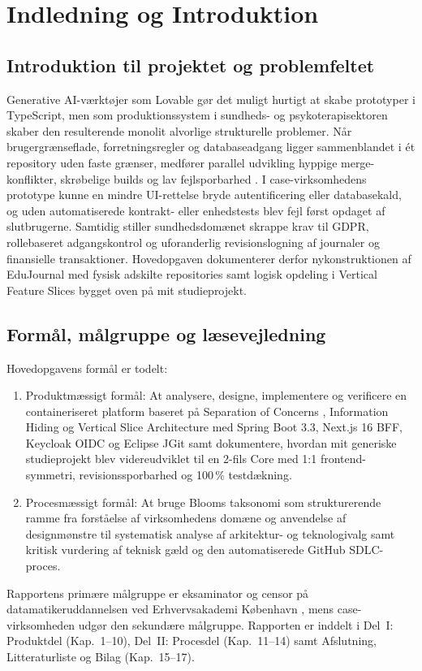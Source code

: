 \documentclass[11pt,a4paper]{article}
\begin{document}
\section{Indledning og Introduktion}

\subsection{Introduktion til projektet og problemfeltet}
Generative AI-værktøjer som Lovable gør det muligt hurtigt at skabe prototyper i TypeScript, men som produktionssystem i sundheds- og psykoterapisektoren skaber den resulterende monolit alvorlige strukturelle problemer. Når brugergrænseflade, forretningsregler og databaseadgang ligger sammenblandet i ét repository uden faste grænser, medfører parallel udvikling hyppige merge-konflikter, skrøbelige builds og lav fejlsporbarhed \cite{fowler2002, newman2021}. I case-virksomhedens prototype kunne en mindre UI-rettelse bryde autentificering eller databasekald, og uden automatiserede kontrakt- eller enhedstests blev fejl først opdaget af slutbrugerne. Samtidig stiller sundhedsdomænet skrappe krav til GDPR, rollebaseret adgangskontrol og uforanderlig revisionslogning af journaler og finansielle transaktioner. Hovedopgaven dokumenterer derfor nykonstruktionen af EduJournal med fysisk adskilte repositories samt logisk opdeling i Vertical Feature Slices bygget oven på mit studieprojekt.

\subsection{Formål, målgruppe og læsevejledning}
Hovedopgavens formål er todelt:
\begin{enumerate}[noitemsep]
    \item Produktmæssigt formål: At analysere, designe, implementere og verificere en containeriseret platform baseret på Separation of Concerns \cite{fowler2002}, Information Hiding \cite{parnas1972} og Vertical Slice Architecture \cite{bogard2018} med Spring Boot 3.3, Next.js 16 BFF, Keycloak OIDC og Eclipse JGit samt dokumentere, hvordan mit generiske studieprojekt blev videreudviklet til en 2-fils Core med 1:1 frontend-symmetri, revisionssporbarhed og 100\,\% testdækning.
    \item Procesmæssigt formål: At bruge Blooms taksonomi \cite{bloom1956} som strukturerende ramme fra forståelse af virksomhedens domæne og anvendelse af designmønstre til systematisk analyse af arkitektur- og teknologivalg samt kritisk vurdering af teknisk gæld og den automatiserede GitHub SDLC-proces.
\end{enumerate}
Rapportens primære målgruppe er eksaminator og censor på datamatikeruddannelsen ved Erhvervsakademi København \cite{ek_studieordning2024}, mens case-virksomheden udgør den sekundære målgruppe. Rapporten er inddelt i Del~I: Produktdel (Kap.~1--10), Del~II: Procesdel (Kap.~11--14) samt Afslutning, Litteraturliste og Bilag (Kap.~15--17).
\end{document}
